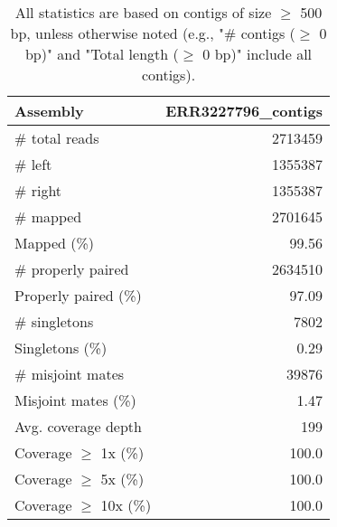 \documentclass[12pt,a4paper]{article}
\begin{document}
\begin{table}[ht]
\begin{center}
\caption{All statistics are based on contigs of size $\geq$ 500 bp, unless otherwise noted (e.g., "\# contigs ($\geq$ 0 bp)" and "Total length ($\geq$ 0 bp)" include all contigs).}
\begin{tabular}{|l*{1}{|r}|}
\hline
Assembly & ERR3227796\_contigs \\ \hline
\# total reads & 2713459 \\ \hline
\# left & 1355387 \\ \hline
\# right & 1355387 \\ \hline
\# mapped & 2701645 \\ \hline
Mapped (\%) & 99.56 \\ \hline
\# properly paired & 2634510 \\ \hline
Properly paired (\%) & 97.09 \\ \hline
\# singletons & 7802 \\ \hline
Singletons (\%) & 0.29 \\ \hline
\# misjoint mates & 39876 \\ \hline
Misjoint mates (\%) & 1.47 \\ \hline
Avg. coverage depth & 199 \\ \hline
Coverage $\geq$ 1x (\%) & 100.0 \\ \hline
Coverage $\geq$ 5x (\%) & 100.0 \\ \hline
Coverage $\geq$ 10x (\%) & 100.0 \\ \hline
\end{tabular}
\end{center}
\end{table}
\end{document}
